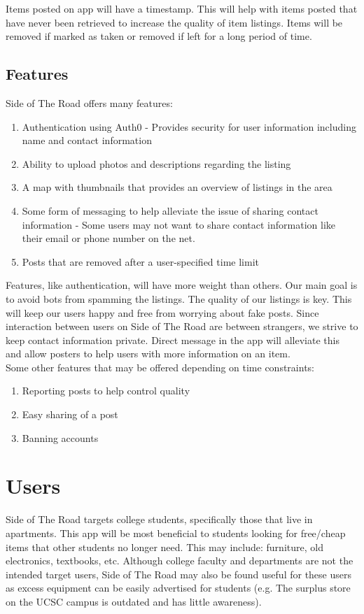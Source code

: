 \documentclass[sigconf]{acmart}
\begin{document}
\noindent
Items posted on app will have a timestamp. This will help with items posted that have never been retrieved to increase the quality of item listings. Items will be removed if marked as taken or removed if left for a long period of time.


\subsection{Features}
Side of The Road offers many features:
\begin{enumerate}
	\item Authentication using Auth0 - Provides security for user information including name and 
	contact information
	\item Ability to upload photos and descriptions regarding the listing
	\item A map with thumbnails that provides an overview of listings in the area
	\item Some form of messaging to help alleviate the issue of sharing contact information - Some 	users may not want to share contact information like their email or phone number on the net.
	\item Posts that are removed after a user-specified time limit
\end{enumerate}


\noindent
Features, like authentication, will have more weight than others. Our main goal is to avoid bots from spamming the listings. The quality of our listings is key. This will keep our users happy and free from worrying about fake posts. Since interaction between users on Side of The Road are between strangers, we strive to keep contact information private. Direct message in the app will alleviate this and allow posters to help users with more information on an item. \\

\noindent
Some other features that may be offered depending on time constraints:
\begin{enumerate}
	\item Reporting posts to help control quality
	\item Easy sharing of a post
	\item Banning accounts
\end{enumerate}


\section{Users}
Side of The Road targets college students, specifically those that live in apartments. This app will be most beneficial to students looking for free/cheap items that other students no longer need. This may include: furniture, old electronics, textbooks, etc. Although college faculty and departments are not the intended target users, Side of The Road may also be found useful for these users as excess equipment can be easily advertised for students (e.g. The surplus store on the UCSC campus is outdated and has little awareness).
\end{document}
